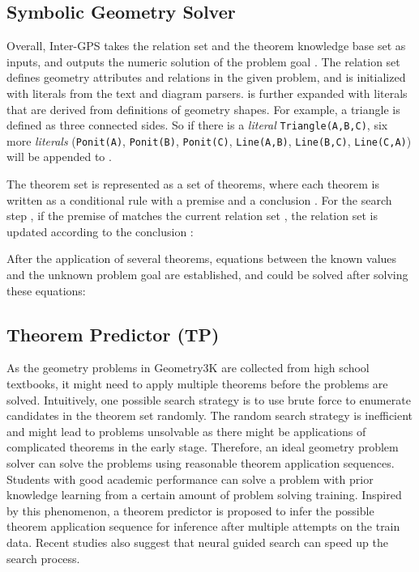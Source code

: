\documentclass[11pt,a4paper]{article}
\begin{document}
\subsection{Symbolic Geometry Solver} \label{sec:symbolic_solver}

Overall, Inter-GPS takes the relation set  and the theorem knowledge base set  as inputs, and outputs the numeric solution  of the problem goal . The relation set  defines geometry attributes and relations in the given problem, and is initialized with literals from the text and diagram parsers.   is further expanded with literals that are derived from definitions of geometry shapes. For example, a triangle is defined as three connected sides. So if there is a \textit{literal} \small\texttt{Triangle(A,B,C)}\normalsize, six more \textit{literals} (\small \texttt{Ponit(A)}, \texttt{Ponit(B)}, \texttt{Ponit(C)}, \texttt{Line(A,B)}, \texttt{Line(B,C)}, \texttt{Line(C,A)}\normalsize) will be appended to .

The theorem set  is represented as a set of theorems, where each theorem  is written as a conditional rule with a premise  and a conclusion . For the search step , if the premise  of  matches the current relation set , the relation set is updated according to the conclusion :

After the application of several theorems, equations between the known values and the unknown problem goal  are established, and  could be solved after solving these equations:


\subsection{Theorem Predictor (TP)}
As the geometry problems in Geometry3K are collected from high school textbooks, it might need to apply multiple theorems before the problems are solved. Intuitively, one possible search strategy is to use brute force to enumerate candidates in the theorem set randomly. The random search strategy is inefficient and might lead to problems unsolvable as there might be applications of complicated theorems in the early stage. Therefore, an ideal geometry problem solver can solve the problems using reasonable theorem application sequences. Students with good academic performance can solve a problem with prior knowledge learning from a certain amount of problem solving training. Inspired by this phenomenon, a theorem predictor is proposed to infer the possible theorem application sequence for inference after multiple attempts on the train data. Recent studies \cite{loos2017deep,balunovic2018learning} also suggest that neural guided search can speed up the search process.
\end{document}

